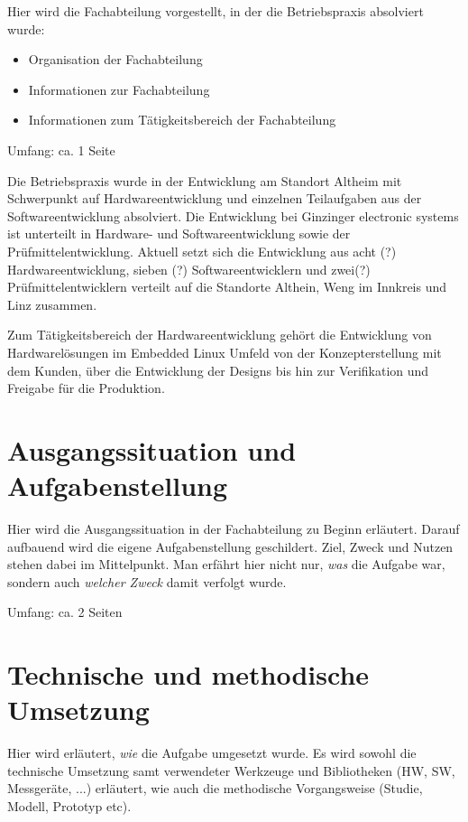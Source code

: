 \documentclass[praktikum,german]{hgbthesis}
\begin{document}
\color{blue}
Hier wird die Fachabteilung vorgestellt, in der die Betriebspraxis absolviert wurde:
\begin{itemize}
	\item Organisation der Fachabteilung
	\item Informationen zur Fachabteilung
	\item Informationen zum Tätigkeitsbereich der Fachabteilung
\end{itemize}

\vskip 8mm
Umfang: ca. 1 Seite
\color{black}

Die Betriebspraxis wurde in der Entwicklung am Standort Altheim mit Schwerpunkt auf Hardwareentwicklung 
und einzelnen Teilaufgaben aus der Softwareentwicklung absolviert. 
Die Entwicklung bei Ginzinger electronic systems ist unterteilt in Hardware- und Softwareentwicklung sowie der 
Prüfmittelentwicklung. Aktuell setzt sich die Entwicklung aus acht (?) Hardwareentwicklung, sieben (?) 
Softwareentwicklern und zwei(?) Prüfmittelentwicklern verteilt auf die Standorte Althein, Weng im Innkreis und 
Linz zusammen.

Zum Tätigkeitsbereich der Hardwareentwicklung gehört die Entwicklung von Hardwarelösungen im Embedded Linux 
Umfeld von der Konzepterstellung mit dem Kunden, über die Entwicklung der Designs bis hin zur Verifikation und 
Freigabe für die Produktion. 

\chapter{Ausgangssituation und Aufgabenstellung}
\color{blue}
Hier wird die Ausgangssituation in der Fachabteilung zu Beginn erläutert. Darauf aufbauend wird die eigene Aufgabenstellung geschildert. Ziel, Zweck und Nutzen stehen dabei im Mittelpunkt. Man erfährt hier nicht nur, \emph{was} die Aufgabe war, sondern auch \emph{welcher Zweck} damit verfolgt wurde.

\vskip 8mm
Umfang: ca. 2 Seiten
\color{black}


\chapter{Technische und methodische Umsetzung}
\color{blue}
Hier wird erläutert, \emph{wie} die Aufgabe umgesetzt wurde. Es wird sowohl die technische Umsetzung samt verwendeter Werkzeuge und Bibliotheken (HW, SW, Messgeräte, ...) erläutert, wie auch die methodische Vorgangsweise (Studie, Modell, Prototyp etc).
\end{document}
